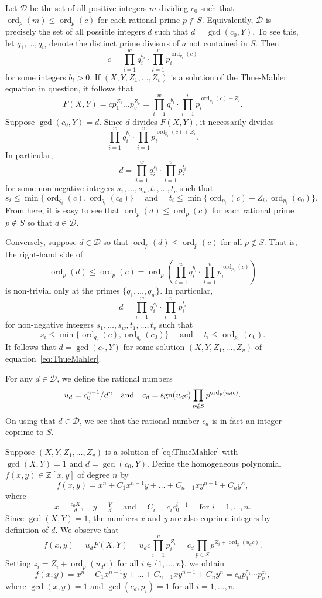 \documentclass[11pt]{report}
\theoremstyle{definition}
\DeclareMathOperator{\ord}{ord}
\DeclareMathOperator{\sgn}{sgn}
\begin{document}
Let $\mathcal{D}$ be the set of all positive integers $m$ dividing $c_0$ such that ${\ord_p(m)\leq \ord_p(c)}$ for each rational prime $p\notin S$. Equivalently, $\mathcal{D}$ is precisely the set of all possible integers $d$ such that $d = \gcd(c_0,Y)$. To see this, let $q_1, \dots, q_{w}$ denote the distinct prime divisors of $a$ not contained in $S$. Then
\[c = \prod_{i=1}^w q_i^{b_i}\cdot \prod_{i=1}^v p_i^{\ord_{p_i}(c)}\]
for some integers $b_i >0$. If $(X,Y,Z_1, \dots, Z_v)$ is a solution of the Thue-Mahler equation in question, it follows that
\[F(X,Y) = cp_1^{Z_1}\dots p_v^{Z_v} =  \prod_{i=1}^w q_i^{b_i}\cdot \prod_{i=1}^v p_i^{\ord_{p_i}(c) + Z_i}.\]
Suppose $\gcd(c_0,Y) = d$. Since $d$ divides $F(X,Y)$, it necessarily divides
\[{\prod_{i=1}^w q_i^{b_i}\cdot \prod_{i=1}^v p_i^{\ord_{p_i}(c) + Z_i}}.\]
In particular,
\[d = \prod_{i=1}^w q_i^{s_i}\cdot \prod_{i=1}^v p_i^{t_i}\]
for some non-negative integers $s_1, \dots, s_w, t_1, \dots, t_v$ such that
\[s_i \leq \min\{\ord_{q_i}(c), \ord_{q_i}(c_0)\} \quad \text{ and } \quad
	t_i \leq \min\{\ord_{p_i}(c) + Z_i, \ord_{p_i}(c_0)\}.\]
From here, it is easy to see that ${\ord_p(d)\leq \ord_p(c)}$ for each rational prime $p\notin S$ so that $d \in \mathcal{D}$.

Conversely, suppose $d \in \mathcal{D}$ so that $\ord_{p}(d) \leq \ord_{p}(c)$ for all $p \notin S$. That is, the right-hand side of
\[\ord_{p}(d) \leq \ord_{p}(c) =
\ord_p\left(\prod_{i=1}^w q_i^{b_i}\cdot \prod_{i=1}^v p_i^{\ord_{p_i}(c)}\right)\]
is non-trivial only at the primes $\{q_1, \dots, q_w\}$. In particular,
\[d = \prod_{i=1}^w q_i^{s_i}\cdot \prod_{i=1}^v p_i^{t_i}\]
for non-negative integers $s_1, \dots, s_w, t_1, \dots, t_v$ such that
\[s_i \leq \min\{\ord_{q_i}(c), \ord_{q_i}(c_0)\} \quad \text{ and } \quad
	t_i \leq \ord_{p_i}(c_0).\]
It follows that $d = \gcd(c_0,Y)$ for some solution $(X,Y,Z_1, \dots, Z_v)$ of equation~\eqref{eq:ThueMahler}.

For any $d\in \mathcal{D}$, we define the rational numbers
\[u_d = c_0^{n-1}/d^n \quad \textnormal{and}\quad c_d = \sgn(u_dc)\prod_{p\notin S} p^{\ord_p(u_dc)}.\]
On using that $d\in \mathcal{D}$, we see that the rational number $c_d$ is in fact an integer coprime to $S$.

Suppose $(X,Y,Z_1, \dots, Z_v)$ is a solution of \eqref{eq:ThueMahler} with ${\gcd(X,Y) = 1}$ and $d = \gcd(c_0,Y)$. Define the homogeneous polynomial $f(x,y) \in \mathbb{Z}[x,y]$ of degree $n$ by
\[f(x,y) = x^n + C_1 x^{n-1}y + \dots + C_{n-1}xy^{n-1} + C_ny^n,\]
where
\[x=\tfrac{c_0X}{d},\quad y=\tfrac{Y}{d} \quad \text{ and } \quad C_i = c_ic_0^{i-1} \quad \text{ for } i = 1, \dots, n.\]
Since $\gcd(X,Y) = 1$, the numbers $x$ and $y$ are also coprime integers by definition of $d$. We observe that
\[f(x,y) = u_dF(X,Y) = u_dc \prod_{i = 1}^v p_i^{Z_i} = c_d\prod_{p \in S}p^{Z_i + \ord_p(u_dc)}.\]
Setting $z_i = Z_i + \ord_p(u_dc)$ for all $i \in \{1, \dots, v\}$, we obtain
\begin{equation} \label{eq:ThueMahler2}
f(x,y) = x^n + C_1 x^{n-1}y + \dots + C_{n-1}xy^{n-1} + C_ny^n = c_d p_1^{z_1}\cdots p_v^{z_v},
\end{equation}
where $\gcd(x,y) = 1$ and $\gcd(c_d,p_i) = 1$ for all $i = 1, \dots, v$.
\end{document}
